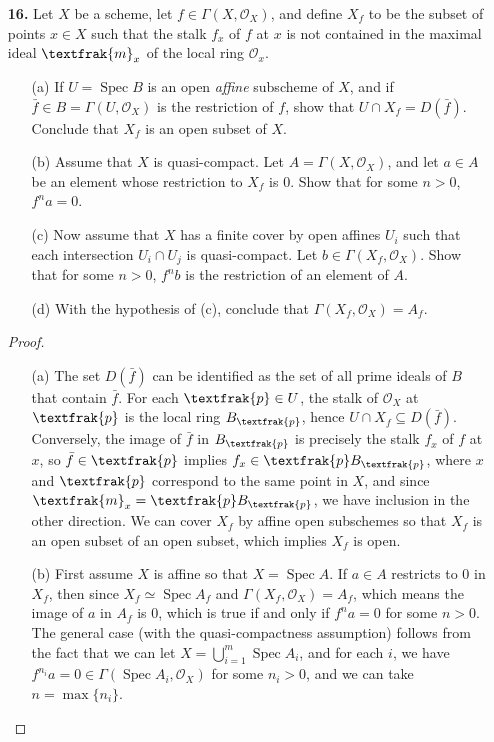 \documentclass{article}
\newcommand{\goth}[1]{\textfrak{#1}}
\newcommand{\fO}{\mathscr{O}}
\DeclareMathOperator{\spec}{Spec}
\begin{document}
\begin{enumerate} [label=\textbf{\arabic*.}, leftmargin=0em]
\item[\textbf{16.}] Let $X$ be a scheme, let $f \in \Gamma(X, \fO_X)$, and define $X_f$ to be the subset of points $x \in X$ such that the stalk $f_x$ of $f$ at $x$ is not contained in the maximal ideal $\goth{m}_x$ of the local ring $\fO_x$.
\begin{itemize}
    \item[(a)] If $U = \spec{B}$ is an open \textit{affine} subscheme of $X$, and if $\bar{f} \in B = \Gamma(U, \fO_X)$ is the restriction of $f$, show that $U \cap X_f = D(\bar{f})$. Conclude that $X_f$ is an open subset of $X$.
    \item[(b)] Assume that $X$ is quasi-compact. Let $A = \Gamma(X, \fO_X)$, and let $a \in A$ be an element whose restriction to $X_f$ is $0$. Show that for some $n > 0$, $f^n a = 0$.
    \item[(c)] Now assume that $X$ has a finite cover by open affines $U_i$ such that each intersection $U_i \cap U_j$ is quasi-compact. Let $b \in \Gamma(X_f, \fO_X)$. Show that for some $n > 0$, $f^n b$ is the restriction of an element of $A$.
    \item[(d)] With the hypothesis of (c), conclude that $\Gamma(X_f, \fO_{X}) = A_f$.
\end{itemize}

\begin{proof} $ $ \vspace{0pt}
    \begin{itemize} [leftmargin=0cm]
        \item[(a)] The set $D(\bar{f})$ can be identified as the set of all prime ideals of $B$ that contain $\bar{f}$. For each $\goth{p} \in U$, the stalk of $\fO_X$ at $\goth{p}$ is the local ring $B_\goth{p}$, hence $U \cap X_f \subseteq D(\bar{f})$. Conversely, the image of $\bar{f}$ in $B_\goth{p}$ is precisely the stalk $f_x$ of $f$ at $x$, so $\bar{f} \in \goth{p}$ implies $f_x \in \goth{p}B_\goth{p}$, where $x$ and $\goth{p}$ correspond to the same point in $X$, and since $\goth{m}_x = \goth{p} B_\goth{p}$, we have inclusion in the other direction. We can cover $X_f$ by affine open subschemes so that $X_f$ is an open subset of an open subset, which implies $X_f$ is open.

        \item[(b)] First assume $X$ is affine so that $X = \spec{A}$. If $a \in A$ restricts to $0$ in $X_f$, then since $X_f \simeq \spec{A_f}$ and $\Gamma(X_f, \fO_X) = A_f$, which means the image of $a$ in $A_f$ is $0$, which is true if and only if $f^n a = 0$ for some $n > 0$. The general case (with the quasi-compactness assumption) follows from the fact that we can let $X = \bigcup_{i = 1}^m \spec{A_i}$, and for each $i$, we have $f^{n_i} a = 0 \in \Gamma(\spec{A_i}, \fO_X)$ for some $n_i > 0$, and we can take $n = \max\{ n_i \}$.


\end{itemize}
\end{proof}
\end{enumerate}
\end{document}
